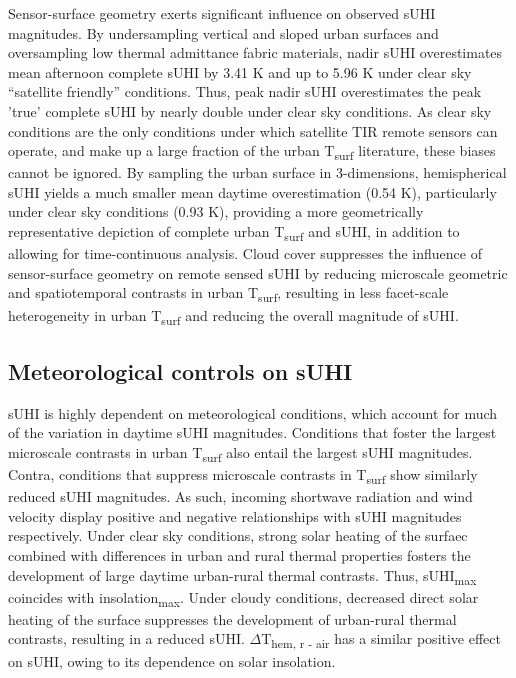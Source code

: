 Sensor-surface geometry exerts significant influence on observed sUHI magnitudes. By undersampling vertical and sloped urban surfaces and oversampling low thermal admittance fabric materials, nadir sUHI overestimates mean afternoon complete sUHI by 3.41 \si{\kelvin} and up to 5.96 \si{\kelvin} under clear sky “satellite friendly” conditions. Thus, peak nadir sUHI overestimates the peak 'true' complete sUHI by nearly double under clear sky conditions. As clear sky conditions are the only conditions under which satellite TIR remote sensors can operate, and make up a large fraction of the urban T\textsubscript{surf} literature, these biases cannot be ignored. By sampling the urban surface in 3-dimensions, hemispherical sUHI yields a much smaller mean daytime overestimation (0.54 \si{\kelvin}), particularly under clear sky conditions (0.93 \si{\kelvin}), providing a more geometrically representative depiction of complete urban T\textsubscript{surf} and sUHI, in addition to allowing for time-continuous analysis. Cloud cover suppresses the influence of sensor-surface geometry on remote sensed sUHI by reducing microscale geometric and spatiotemporal contrasts in urban T\textsubscript{surf}, resulting in less facet-scale heterogeneity in urban T\textsubscript{surf} and reducing the overall magnitude of sUHI.


\subsection{Meteorological controls on sUHI}

sUHI is highly dependent on meteorological conditions, which account for much of the variation in daytime sUHI magnitudes. Conditions that foster the largest microscale contrasts in urban T\textsubscript{surf} also entail the largest sUHI magnitudes. Contra, conditions that suppress microscale contrasts in T\textsubscript{surf} show similarly reduced sUHI magnitudes. As such, incoming shortwave radiation and wind velocity display positive and negative relationships with sUHI magnitudes respectively. Under clear sky conditions, strong solar heating of the surfaec combined with differences in urban and rural thermal properties fosters the development of large daytime urban-rural thermal contrasts. Thus, sUHI\textsubscript{max} coincides with insolation\textsubscript{max}. Under cloudy conditions, decreased direct solar heating of the surface suppresses the development of urban-rural thermal contrasts, resulting in a reduced sUHI. $\Delta$T\textsubscript{hem, r - air} has a similar positive effect on sUHI, owing to its dependence on solar insolation. 

